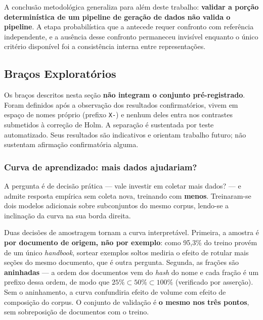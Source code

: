 A conclusão metodológica generaliza para além deste trabalho: \textbf{validar a porção determinística de um pipeline de geração de dados não valida o pipeline}. A etapa probabilística que a antecede requer confronto com referência independente, e a ausência desse confronto permaneceu invisível enquanto o único critério disponível foi a consistência interna entre representações.

\subsection{Braços Exploratórios}
\label{subsec:res-exploratorios}

Os braços descritos nesta seção \textbf{não integram o conjunto pré-registrado}. Foram definidos após a observação dos resultados confirmatórios, vivem em espaço de nomes próprio (prefixo \texttt{X-}) e nenhum deles entra nos contrastes submetidos à correção de Holm. A separação é sustentada por teste automatizado. Seus resultados são indicativos e orientam trabalho futuro; não sustentam afirmação confirmatória alguma.

\subsubsection*{Curva de aprendizado: mais dados ajudariam?}

A pergunta é de decisão prática --- vale investir em coletar mais dados? --- e admite resposta empírica sem coleta nova, treinando com \textbf{menos}. Treinaram-se dois modelos adicionais sobre subconjuntos do mesmo corpus, lendo-se a inclinação da curva na sua borda direita.

Duas decisões de amostragem tornam a curva interpretável. Primeira, a amostra é \textbf{por documento de origem, não por exemplo}: como 95,3\% do treino provém de um único \textit{handbook}, sortear exemplos soltos mediria o efeito de rotular mais seções do mesmo documento, que é outra pergunta. Segunda, as frações são \textbf{aninhadas} --- a ordem dos documentos vem do \textit{hash} do nome e cada fração é um prefixo dessa ordem, de modo que $25\% \subset 50\% \subset 100\%$ (verificado por asserção). Sem o aninhamento, a curva confundiria efeito de volume com efeito de composição do corpus. O conjunto de validação é \textbf{o mesmo nos três pontos}, sem sobreposição de documentos com o treino.

